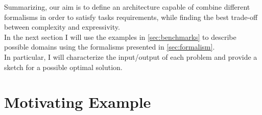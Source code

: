 \documentclass[pdftex,12pt,a4paper]{report}
\begin{document}
\noindent Summarizing, our aim is to define an architecture capable of combine different formalisms in order to satisfy tasks requirements, while finding the best trade-off between complexity and expressivity. \\

\noindent In the next section I will use the examples in \ref{sec:benchmarks} to describe possible domains using the formalisms presented in \ref{sec:formalism}. \\
In particular, I will characterize the input/output of each problem and provide a sketch for a possible optimal solution.



\section{Motivating Example}
\label{sec:motivating}
%
%
\end{document}
